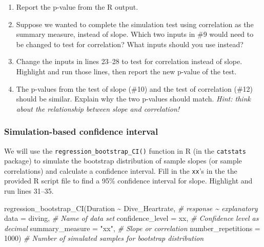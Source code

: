 \documentclass[
]{report}
\newenvironment{Shaded}{\begin{snugshade}}{\end{snugshade}}
\newcommand{\AttributeTok}[1]{\textcolor[rgb]{0.77,0.63,0.00}{#1}}
\newcommand{\CommentTok}[1]{\textcolor[rgb]{0.56,0.35,0.01}{\textit{#1}}}
\newcommand{\DecValTok}[1]{\textcolor[rgb]{0.00,0.00,0.81}{#1}}
\newcommand{\FunctionTok}[1]{\textcolor[rgb]{0.00,0.00,0.00}{#1}}
\newcommand{\NormalTok}[1]{#1}
\newcommand{\SpecialCharTok}[1]{\textcolor[rgb]{0.00,0.00,0.00}{#1}}
\newcommand{\StringTok}[1]{\textcolor[rgb]{0.31,0.60,0.02}{#1}}
\begin{document}
\begin{enumerate}
\def\labelenumi{\arabic{enumi}.}
\setcounter{enumi}{9}
\item
  Report the p-value from the R output.
  \vspace{0.5in}
\item
  Suppose we wanted to complete the simulation test using correlation as the summary measure, instead of slope. Which two inputs in \#9 would need to be changed to test for correlation? What inputs should you use instead?
  \vspace{0.75in}
\item
  Change the inputs in lines 23--28 to test for correlation instead of slope. Highlight and run those lines, then report the new p-value of the test.
  \vspace{0.5in}
\item
  The p-values from the test of slope (\#10) and the test of correlation (\#12) should be similar. Explain why the two p-values should match. \emph{Hint: think about the relationship between slope and correlation!}
  \vspace{1in}
\end{enumerate}

\hypertarget{simulation-based-confidence-interval}{%
\subsubsection*{Simulation-based confidence interval}\label{simulation-based-confidence-interval}}

We will use the \texttt{regression\_bootstrap\_CI()} function in R (in the \texttt{catstats} package) to simulate the bootstrap distribution of sample slopes (or sample correlations) and calculate a confidence interval. Fill in the \texttt{xx}'s in the the provided R script file to find a 95\% confidence interval for slope. Highlight and run lines 31--35.

\begin{Shaded}
\begin{Highlighting}[]
\FunctionTok{regression\_bootstrap\_CI}\NormalTok{(Duration }\SpecialCharTok{\textasciitilde{}}\NormalTok{ Dive\_Heartrate, }\CommentTok{\# response \textasciitilde{} explanatory}
   \AttributeTok{data =}\NormalTok{ diving, }\CommentTok{\# Name of data set}
   \AttributeTok{confidence\_level =}\NormalTok{ xx, }\CommentTok{\# Confidence level as decimal}
   \AttributeTok{summary\_measure =} \StringTok{"xx"}\NormalTok{, }\CommentTok{\# Slope or correlation}
   \AttributeTok{number\_repetitions =} \DecValTok{1000}\NormalTok{) }\CommentTok{\# Number of simulated samples for bootstrap distribution}
\end{Highlighting}
\end{Shaded}
\end{document}
